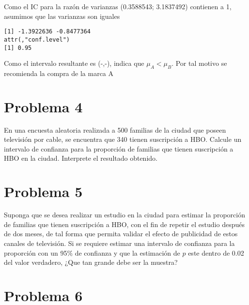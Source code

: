 \documentclass[
]{article}
\newenvironment{Shaded}{\begin{snugshade}}{\end{snugshade}}
\newcommand{\AttributeTok}[1]{\textcolor[rgb]{0.77,0.63,0.00}{#1}}
\newcommand{\FunctionTok}[1]{\textcolor[rgb]{0.00,0.00,0.00}{#1}}
\newcommand{\NormalTok}[1]{#1}
\newcommand{\SpecialCharTok}[1]{\textcolor[rgb]{0.00,0.00,0.00}{#1}}
\begin{document}
Como el IC para la razón de varianzas (0.3588543; 3.1837492) contienen a
1, asumimos que las varianzas son iguales

\begin{Shaded}
\end{Shaded}

\begin{verbatim}
[1] -1.3922636 -0.8477364
attr(,"conf.level")
[1] 0.95
\end{verbatim}

Como el intervalo resultante es (-,-), indica que \(\mu_{A} < \mu_{B}\).
Por tal motivo se recomienda la compra de la marca A

\hypertarget{problema-4}{%
\section{\texorpdfstring{\textbf{Problema
4}}{Problema 4}}\label{problema-4}}

En una encuesta aleatoria realizada a 500 familias de la ciudad que
poseen televisión por cable, se encuentra que 340 tienen suscripción a
HBO. Calcule un intervalo de confianza para la proporción de familias
que tienen suscripción a HBO en la ciudad. Interprete el resultado
obtenido.

\hypertarget{problema-5}{%
\section{\texorpdfstring{\textbf{Problema
5}}{Problema 5}}\label{problema-5}}

Suponga que se desea realizar un estudio en la ciudad para estimar la
proporción de familias que tienen suscripción a HBO, con el fin de
repetir el estudio después de dos meses, de tal forma que permita
validar el efecto de publicidad de estos canales de televisión. Si se
requiere estimar una intervalo de confianza para la proporción con un
95\% de confianza y que la estimación de \(p\) este dentro de 0.02 del
valor verdadero, ¿Que tan grande debe ser la muestra?

\hypertarget{problema-6}{%
\section{\texorpdfstring{\textbf{Problema
6}}{Problema 6}}\label{problema-6}}
\end{document}
